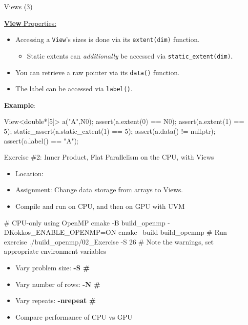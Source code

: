 \begin{frame}[fragile]{Views (3)}

  \ul{\textbf{View} Properties:}

  \begin{itemize}
    \item Accessing a \texttt{View}'s sizes is done via its \texttt{extent(dim)} function.
         \begin{itemize}
		 \item Static extents can \emph{additionally} be accessed via \texttt{static\_extent(dim)}.
	 \end{itemize}
    \item You can retrieve a raw pointer via its \texttt{data()} function.
    \item The label can be accessed via \texttt{label()}.
  \end{itemize}

  \textbf{Example}:

  \begin{code}[keywords={View,extent,static_extent,data,label}]
	  View<double*[5]> a("A",N0);
	  assert(a.extent(0) == N0);
	  assert(a.extent(1) == 5);
	  static_assert(a.static_extent(1) == 5);
	  assert(a.data() != nullptr);
	  assert(a.label() == "A");
  \end{code}

\end{frame}

\begin{frame}[fragile]{Exercise \#2: Inner Product, Flat Parallelism on the CPU, with Views}

  \begin{small}
  \begin{itemize}
  \item Location: 
  \item Assignment: Change data storage from arrays to Views.
  \item Compile and run on CPU, and then on GPU with UVM
  \end{itemize}
  \end{small}

\begin{code}
# CPU-only using OpenMP
cmake -B build_openmp -DKokkos_ENABLE_OPENMP=ON
cmake --build build_openmp
# Run exercise
./build_openmp/02_Exercise -S 26
# Note the warnings, set appropriate environment variables
\end{code}

  \begin{scriptsize}
  \begin{itemize}
  \item Vary problem size: \textbf{-S \#}
  \item Vary number of rows: \textbf{-N \#}
  \item Vary repeats: \textbf{-nrepeat \#}
  \item Compare performance of CPU vs GPU
  \end{itemize}
  \end{scriptsize}

\end{frame}

